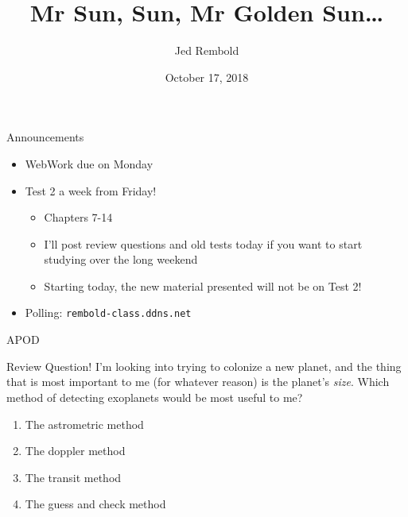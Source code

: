 \documentclass[pdf, aspectratio=169]{beamer}
\title{Mr Sun, Sun, Mr Golden Sun\ldots}
\date{October 17, 2018}
\author{Jed Rembold}
\begin{document}
\renewcommand*{\theenumi}{\Alph{enumi}}

\begin{frame}{Announcements}
	\begin{itemize}
	  \item WebWork due on Monday
	  \item Test 2 a week from Friday!
		\begin{itemize}
		  \item Chapters 7-14
		  \item I'll post review questions and old tests today if you want to start studying over the long weekend
		  \item Starting today, the new material presented will \alert{not} be on Test 2!
		\end{itemize}
	  \item Polling: \nolinkurl{rembold-class.ddns.net}
	\end{itemize}
\end{frame}

\begin{frame}{APOD}
	\begin{center}
	\end{center}
\end{frame}

\begin{frame}{Review Question!}
  I'm looking into trying to colonize a new planet, and the thing that is most important to me (for whatever reason) is the planet's \emph{size}. Which method of detecting exoplanets would be most useful to me?
  \begin{enumerate}
	\item The astrometric method
	\item The doppler method
	\item \alert<2>{The transit method}
	\item The guess and check method
  \end{enumerate}
\end{frame}
\end{document}
